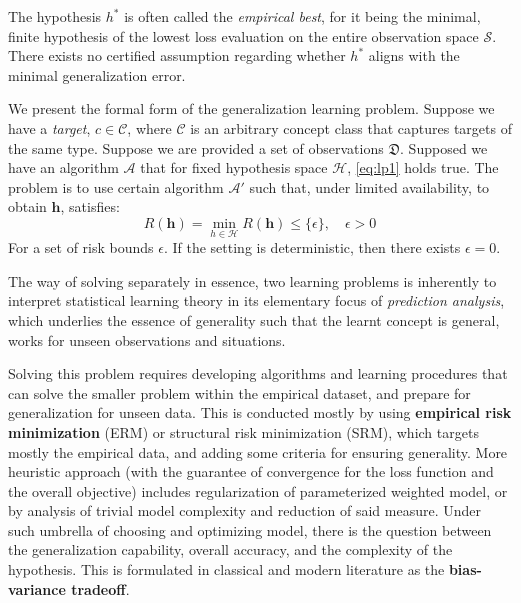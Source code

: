 The hypothesis $h^{*}$ is often called the \textit{empirical best}, for it being the minimal, finite hypothesis of the lowest loss evaluation on the entire observation space $\mathcal{S}$. There exists no certified assumption regarding whether $h^{*}$ aligns with the minimal generalization error.

\begin{definition}
    We present the formal form of the generalization learning problem. Suppose we have a \textit{target}, $c\in\mathcal{C}$, where $\mathcal{C}$ is an arbitrary concept class that captures targets of the same type. Suppose we are provided a set of observations $\mathfrak{D}$. Supposed we have an algorithm $\mathcal{A}$ that for fixed hypothesis space $\mathcal{H}$, \eqref{eq:lp1} holds true. The problem is to use certain algorithm $\mathcal{A}'$ such that, under limited availability, to obtain $\bm{h}$, satisfies: \begin{equation}
        R(\bm{h}) = \min_{h\in \mathcal{H}} R(\bm{h}) \leq \{\epsilon\}, \quad \epsilon > 0 
    \end{equation}
    For a set of risk bounds $\epsilon$. If the setting is deterministic, then there exists $\epsilon=0$. 
\end{definition}

The way of solving separately in essence, two learning problems is inherently to interpret statistical learning theory in its elementary focus of \textit{prediction analysis}, which underlies the essence of generality such that the learnt concept is general, works for unseen observations and situations. 

Solving this problem requires developing algorithms and learning procedures that can solve the smaller problem within the empirical dataset, and prepare for generalization for unseen data. This is conducted mostly by using \textbf{empirical risk minimization} (ERM) or structural risk minimization (SRM), which targets mostly the empirical data, and adding some criteria for ensuring generality. More heuristic approach (with the guarantee of convergence for the loss function and the overall objective) includes regularization of parameterized weighted model, or by analysis of trivial model complexity and reduction of said measure. Under such umbrella of choosing and optimizing model, there is the question between the generalization capability, overall accuracy, and the complexity of the hypothesis. This is formulated in classical and modern literature as the \textbf{bias-variance tradeoff}. 

